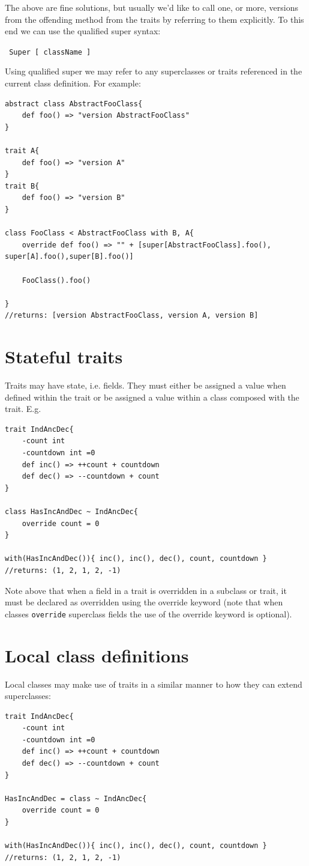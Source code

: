 \documentclass[conc-doc]{subfiles}
\begin{document}
The above are fine solutions, but usually we'd like to call one, or more, versions from the offending method from the traits by referring to them explicitly. To this end we can use the qualified super syntax:

\begin{center}
	\lstinline{ Super [ className ] }
\end{center}

Using qualified super we may refer to any superclasses or traits referenced in the current class definition. For example:
\begin{lstlisting}
abstract class AbstractFooClass{
	def foo() => "version AbstractFooClass"
}

trait A{
	def foo() => "version A"
}
trait B{
	def foo() => "version B"
}

class FooClass < AbstractFooClass with B, A{
	override def foo() => "" + [super[AbstractFooClass].foo(), super[A].foo(),super[B].foo()]
	
	FooClass().foo()
	
}
//returns: [version AbstractFooClass, version A, version B]
\end{lstlisting}

\section{Stateful traits}
Traits may have state, i.e. fields. They must either be assigned a value when defined within the trait or be assigned a value within a class composed with the trait. E.g. 
\begin{lstlisting}
trait IndAncDec{
	-count int
	-countdown int =0
	def inc() => ++count + countdown
	def dec() => --countdown + count
}

class HasIncAndDec ~ IndAncDec{
	override count = 0
}

with(HasIncAndDec()){ inc(), inc(), dec(), count, countdown }
//returns: (1, 2, 1, 2, -1)
\end{lstlisting}

Note above that when a field in a trait is overridden in a subclass or trait, it must be declared as overridden using the override keyword (note that when classes \lstinline{override} superclass fields the use of the override keyword is optional).

\section{Local class definitions}
Local classes may make use of traits in a similar manner to how they can extend superclasses:
\begin{lstlisting}
trait IndAncDec{
	-count int
	-countdown int =0
	def inc() => ++count + countdown
	def dec() => --countdown + count
}

HasIncAndDec = class ~ IndAncDec{
	override count = 0
}

with(HasIncAndDec()){ inc(), inc(), dec(), count, countdown }
//returns: (1, 2, 1, 2, -1)
\end{lstlisting}
\end{document}
